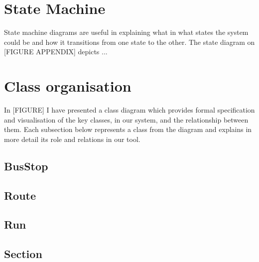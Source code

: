 \section{State Machine}
State machine diagrams are useful in explaining what in what states the system could be and how it transitions from one state to the other. The state diagram on [FIGURE APPENDIX] depicts ...

\section{Class organisation}
In [FIGURE] I have presented a class diagram which provides formal specification and visualisation of the key classes, in our system, and the relationship between them. Each subsection below represents a class from the diagram and explains in more detail its role and relations in our tool.

\subsection{BusStop}

\subsection{Route}

\subsection{Run}

\subsection{Section}
